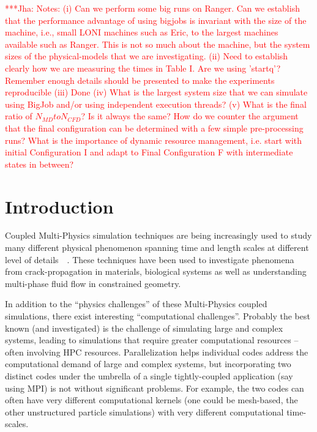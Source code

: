 \documentclass[conference,final]{IEEEtran}
\newcommand{\jhanote}[1]{ {\textcolor{red} { ***Jha: #1 }}}
\newcommand{\jhanote}[1]{}
\begin{document}
\jhanote{Notes: (i) Can we perform some big runs on Ranger. Can we
  establish that the performance advantage of using bigjobs is
  invariant with the size of the machine, i.e., small LONI machines
  such as Eric, to the largest machines available such as Ranger. This
  is not so much about the machine, but the system sizes of the
  physical-models that we are investigating. (ii) Need to establish
  clearly how we are measuring the times in Table I. Are we using
  'startq'? Remember enough details should be presented to make the
  experiments reproducible (iii) Done %
 (iv) What is the largest system size that we can simulate using BigJob and/or
  using independent execution threads? (v) What is the final ratio of
  $N_{MD} to N_{CFD}$? Is it always the same? How do we counter the
  argument that the final configuration can be determined with a few
  simple pre-processing runs? What is the importance of dynamic
  resource management, i.e. start with initial Configuration I and
  adapt to Final Configuration F with intermediate states in between?
}


\section{Introduction}

Coupled Multi-Physics simulation techniques are being increasingly
used to study many different physical phenomenon spanning time and
length scales at different level of
details~\cite{Tai}~\cite{Watanabe}. These techniques have been used to
investigate phenomena from crack-propagation in materials, biological
systems as well as understanding multi-phase fluid flow in constrained
geometry.

In addition to the ``physics challenges'' of these Multi-Physics
coupled simulations, there exist interesting ``computational
challenges''. Probably the best known (and investigated) is the
challenge of simulating large and complex systems, leading to
simulations that require greater computational resources -- often
involving HPC resources. %
Parallelization helps individual codes address the computational
demand of large and complex systems, but incorporating two distinct
codes under the umbrella of a single tightly-coupled application (say
using MPI) is not without significant problems. For example, the two
codes can often have very different computational kernels (one could
be mesh-based, the other unstructured particle simulations) with very
different computational time-scales.
\end{document}
